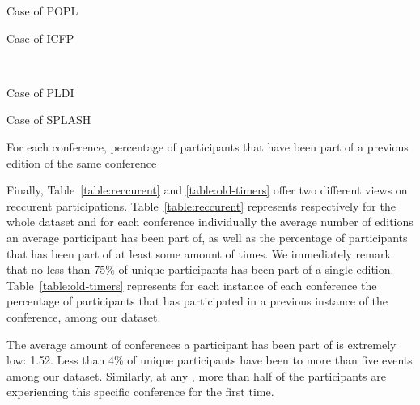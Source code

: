 \begin{table}
  \centering
  \begin{subtable}[b]{0.4\textwidth}
    \centering
    \caption{Case of POPL}
  \end{subtable}
  \begin{subtable}[b]{0.4\textwidth}
    \centering
    \caption{Case of ICFP}
  \end{subtable}
  \\
  \begin{subtable}[b]{0.4\textwidth}
    \centering
    \caption{Case of PLDI}
  \end{subtable}
  \begin{subtable}[b]{0.4\textwidth}
    \centering
    \caption{Case of SPLASH}
  \end{subtable}
  \caption{For each conference, percentage of participants that have been
    part of a previous edition of the same conference }
  \label{table:old-timers}
\end{table}

Finally, Table~\ref{table:reccurent} and \ref{table:old-timers} offer two
different views on reccurent participations. Table~\ref{table:reccurent}
represents respectively for the whole dataset and for each conference
individually the average number of editions an average participant has been part
of, as well as the percentage of participants that has been part of at least
some amount of times. We immediately remark that no less than 75\% of unique
participants has been part of a single edition. Table~\ref{table:old-timers}
represents for each instance of each conference the percentage of participants
that has participated in a previous instance of the conference, among our
dataset.

\begin{obs}
  The average amount of conferences a participant has been part of is extremely low: 1.52.
  Less than 4\% of unique participants have been to more than five events
  among our dataset.
  Similarly, at any \event, more than half of the participants are experiencing this specific
  conference for the first time.
  \label{obs:old-timers}
\end{obs}


